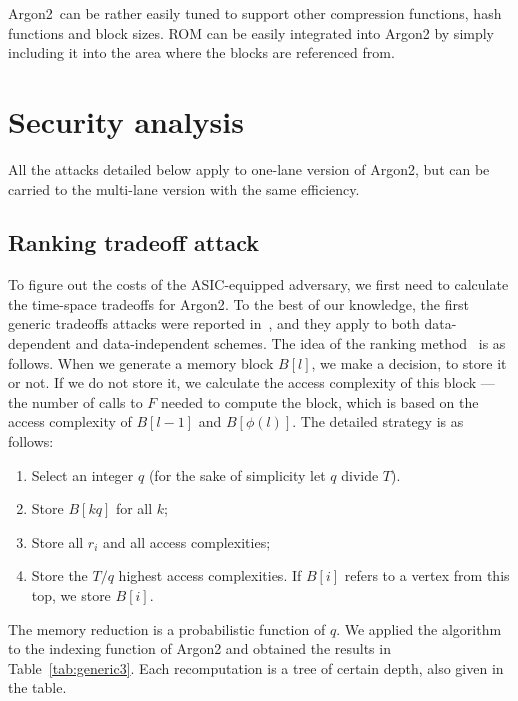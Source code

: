 \documentclass[a4paper]{article}
\begin{document}
Argon2\ can be rather easily tuned to support other compression functions, hash functions and block sizes.
ROM can be easily integrated into \textsf{Argon2} by simply including it into the area where the blocks are referenced from.


\section{Security analysis}



All the attacks detailed below apply to one-lane version of Argon2, but can be carried to the multi-lane version with the same efficiency.

\subsection{Ranking tradeoff attack}\label{sec:tradeoff} To figure out the costs of the ASIC-equipped adversary, we first need to calculate the time-space tradeoffs for \textsf{Argon2}. To the best of our knowledge, the first generic
tradeoffs attacks were reported in~\cite{trade-att}, and they apply to both data-dependent and data-independent schemes. The idea of the ranking method~\cite{trade-att} is as follows. When we generate a memory block $B[l]$, we make a decision, to store it or not. If we do not store it, we calculate the access complexity of this block --- the number of calls to $F$ needed to compute the block, which is based on the access complexity of $B[l-1]$ and $B[\phi(l)]$. The detailed strategy is as follows:
 \begin{enumerate}
 \item Select an integer $q$ (for the sake of simplicity let $q$ divide $T$).
  \item Store $B[kq]$ for all $k$;
  \item Store all $r_i$ and all access complexities;
  \item Store the  $T/q$  highest access complexities. If $B[i]$ refers to a vertex from this top, we store $B[i]$.
\end{enumerate}
The memory reduction is a probabilistic function of $q$. We applied the algorithm  to the indexing function of \textsf{Argon2} and obtained the results in Table~\ref{tab:generic3}. Each recomputation is a tree of certain depth, also given in the table.
\end{document}
